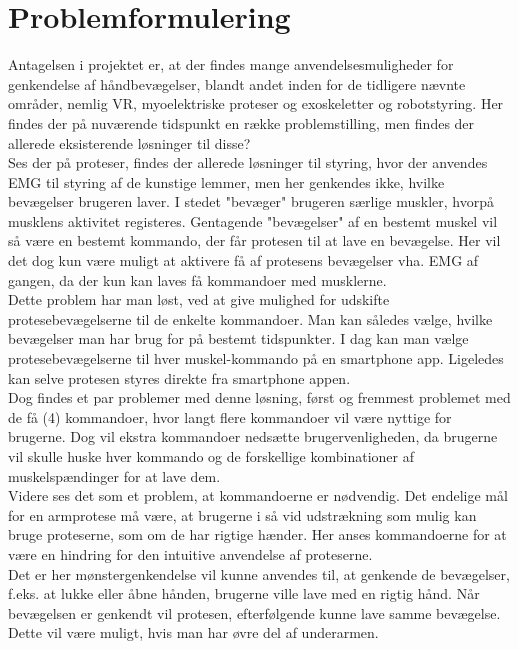 \thispagestyle{fancy}
\chapter{Problemformulering}
\label{chp:problemformulering}

Antagelsen i projektet er, at der findes mange anvendelsesmuligheder for genkendelse af håndbevægelser, blandt andet inden for de tidligere nævnte områder, nemlig VR, myoelektriske proteser og exoskeletter og robotstyring. Her findes der på nuværende tidspunkt en række problemstilling, men findes der allerede eksisterende løsninger til disse?\\

Ses der på proteser, findes der allerede løsninger til styring, hvor der anvendes EMG til styring af de kunstige lemmer, men her genkendes ikke, hvilke bevægelser brugeren laver. I stedet "bevæger" brugeren særlige muskler, hvorpå musklens aktivitet registeres. Gentagende "bevægelser" af en bestemt muskel vil så være en bestemt kommando, der får protesen til at lave en bevægelse. Her vil det dog kun være muligt at aktivere få af protesens bevægelser vha. EMG af gangen, da der kun kan laves få kommandoer med musklerne. \\

Dette problem har man løst, ved at give mulighed for udskifte protesebevægelserne til de enkelte kommandoer. Man kan således vælge, hvilke bevægelser man har brug for på bestemt tidspunkter. I dag kan man vælge protesebevægelserne til hver muskel-kommando på en smartphone app. Ligeledes kan selve protesen styres direkte fra smartphone appen.
\\
Dog findes et par problemer med denne løsning, først og fremmest problemet med de få (4) kommandoer, hvor langt flere kommandoer vil være nyttige for brugerne. Dog vil ekstra kommandoer nedsætte brugervenligheden, da brugerne vil skulle huske hver kommando og de forskellige kombinationer af muskelspændinger for at lave dem.\\

Videre ses det som et problem, at kommandoerne er nødvendig. Det endelige mål for en armprotese må være, at brugerne i så vid udstrækning som mulig kan bruge proteserne, som om de har rigtige hænder. Her anses kommandoerne for at være en hindring for den intuitive anvendelse af proteserne.\\

Det er her mønstergenkendelse vil kunne anvendes til, at genkende de bevægelser, f.eks. at lukke eller åbne hånden, brugerne ville lave med en rigtig hånd. Når bevægelsen er genkendt vil protesen, efterfølgende kunne lave samme bevægelse. Dette vil være muligt, hvis man har øvre del af underarmen. \\

